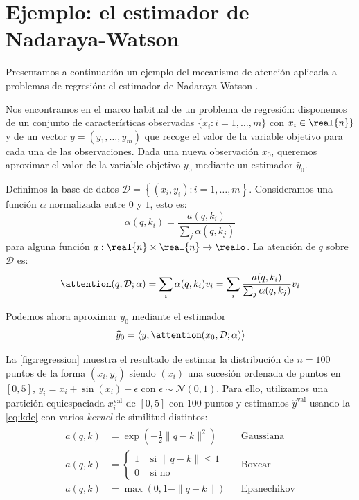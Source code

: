 \section{Ejemplo: el estimador de Nadaraya-Watson}
Presentamos a continuación un ejemplo del mecanismo de atención aplicada a problemas de regresión: el estimador de Nadaraya-Watson \cite{watson1964smooth, nadaraya1964estimating}.

Nos encontramos en el marco habitual de un problema de regresión: disponemos de un conjunto de características observadas \( \{ x_{i} : i = 1, \dots, m \} \) con \( x_{i}  \in \real{n} \} \) y de un vector \( y = (y_1, \dots, y_m) \) que recoge el valor de la variable objetivo para cada una de las observaciones. Dada una nueva observación \( x_{0} \), queremos aproximar el valor de la variable objetivo \( y_{0} \) mediante un estimador \( \widehat{y}_{0} \).

Definimos la base de datos \( \mathcal{D} = \left\{ (x_{i}, y_{i}) : i = 1, \dots, m \right\} \). Consideramos una función \( \alpha \) normalizada entre \( 0 \) y \( 1 \), esto es:
\[
    \alpha(q, k_{i}) = \frac{a(q, k_{i})}{\sum_j \alpha(q, k_{j}) }
\]
para alguna función \( a : \real{n} \times \real{n} \to \realo \). La atención de \( q \) sobre \( \mathcal{D} \) es:
\[
    \attention(q, \mathcal{D}; \alpha) = \sum_i  \alpha(q, k_{i}) v_{i} = \sum_i \frac{a(q, k_{i})}{\sum_j \alpha(q, k_{j})} v_{i}
\]

Podemos ahora aproximar \( y_{0} \) mediante el estimador 
\begin{equation}\label{eq:kde}
    \widehat{y}_{0} = \left\langle y, \attention(x_{0}, \mathcal{D}; \alpha) \right\rangle
\end{equation}

La \cref{fig:regression} muestra el resultado de estimar la distribución de \( n = 100 \) puntos de la forma \( (x_{i}, y_{i}) \) siendo \( (x_{i}) \) una sucesión ordenada de puntos en \( [0, 5] \), \( y_{i} = x_{i} + \sin(x_{i}) + \epsilon \) con \( \epsilon \sim \mathcal{N}(0, 1) \). Para ello, utilizamos una partición equiespaciada \( x^\text{val}_{i} \) de \( [0, 5] \) con 100 puntos y estimamos \( \widehat{y}^\text{val} \) usando la \cref{eq:kde} con varios \textit{kernel} de similitud distintos:
\[
    \begin{split}\begin{aligned}
    a(q, k) & = \exp\left(-\frac{1}{2} \|q - k\|^2 \right) && \mathrm{Gaussiana} \\
    a(q, k) & = \begin{cases}
        1 &\text{ si } \|q - k\| \leq 1 \\
        0 &\text{ si no}
    \end{cases} && \mathrm{Boxcar}
    \\
    a(q, k) & = \max\left(0, 1 - \|q - k\|\right) && \mathrm{Epanechikov}
    \end{aligned}\end{split}
\]

